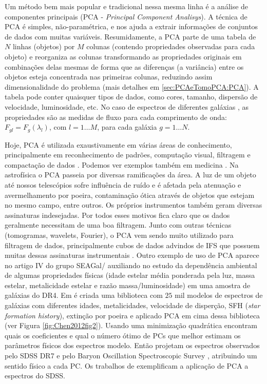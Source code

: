 Um método bem mais popular e tradicional nessa mesma linha é a análise de componentes principais (PCA - {\em Principal
Component Analisys}). A técnica de PCA é simples, não-paramétrica, e nos ajuda a extrair informações de conjuntos de
dados com muitas variáveis. Resumidamente, a PCA parte de uma tabela de $N$ linhas (objetos) por $M$ colunas (contendo
propriedades observadas para cada objeto) e reorganiza as colunas transformando as propriedades originais em combinações
delas mesmas de forma que as diferenças (a variância) entre os objetos  esteja concentrada nas primeiras colunas,
reduzindo assim dimensionalidade do problema (mais detalhes em \ref{sec:PCAeTomoPCA:PCA}). A tabela pode conter
quaisquer tipos de dados, como cores, tamanho, dispersão de velocidade, luminosidade, etc. No caso de espectros de
diferentes galáxias \citep[e.g., ][]{Francis1992, Sodre1994, Sodre1997}, as propriedades são as medidas de fluxo para
cada comprimento de onda: $F_{gl} = F_g(\lambda_l)$, com $l = 1 \ldots M$, para cada galáxia $g = 1 \ldots N$.

Hoje, PCA é utilizada exaustivamente em várias áreas de conhecimento, principalmente em reconhecimento de padrões,
computação visual, filtragem e compactação de dados \citep{Kamruzzaman2010, Borcea2012}. Podemos ver exemplos também em
medicina \citep{Balakrishnan2013}. Na astrofísica o PCA passeia por diversas ramificações da área. A luz de um objeto
até nossos telescópios sofre influência de ruído e é afetada pela atenuação e avermelhamento por poeira, contaminação
ótica através de objetos que estejam no mesmo campo, entre outros. Os próprios instrumentos também geram diversas
assinaturas indesejadas. Por todos esses motivos fica claro que os dados geralmente necessitam de uma boa filtragem.
Junto com outras técnicas (tomogramas, wavelets, Fourier), o PCA vem sendo muito utilizado para filtragem de dados,
principalmente cubos de dados advindos de IFS que possuem muitas dessas assinaturas instrumentais \citep{Riffel2011}.
Outro exemplo de uso de PCA aparece no artigo IV do grupo SEAGal/\starlight \citep{Mateus2007} auxiliando no estudo da
dependência ambiental de algumas propriedades físicas (idade estelar média ponderada pela luz, massa estelar,
metalicidade estelar e razão massa/luminosidade) em uma amostra de galáxias do \SDSS DR4. Em \citet{Chen2012} é criada
uma biblioteca com $25$ mil modelos de espectros de galáxias com diferentes idades, metalicidades, velocidade de
disperção, SFH ({\em star formation history}), extinção por poeira e aplicado PCA em cima dessa biblioteca (ver Figura
\ref{fig:Chen2012fig2}). Usando uma minimização quadrática encontram quais os coeficientes e qual o número ótimo de PCs
que melhor estimam os parâmetros físicos dos espectros modelo. Então projetam os espectros observados pelo SDSS DR7
\citep{Abazajian2009} e pelo Baryon Oscillation Spectroscopic Survey \citep[BOSS][]{Ahn2012}, atribuindo um sentido
físico a cada PC. Os trabalhos de \citet{Ferreras2006, Wild2006, Rogers2007} exemplificam a aplicação de PCA a
espectros do SDSS.

